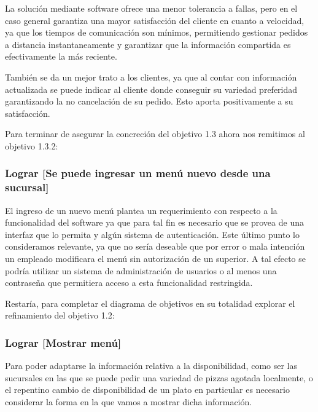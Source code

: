 \documentclass[a4paper,10pt]{article}
\begin{document}
La solución mediante software ofrece una menor tolerancia a fallas, pero en el caso general garantiza una mayor satisfacción del cliente en cuanto a velocidad, ya que los tiempos de comunicación son mínimos, permitiendo gestionar pedidos a distancia instantaneamente y garantizar que la información compartida es efectivamente la más reciente.

También se da un mejor trato a los clientes, ya que al contar con información actualizada se puede indicar al cliente donde conseguir su variedad preferidad garantizando la no cancelación de su pedido. Esto aporta positivamente a su satisfacción.



Para terminar de asegurar la concreción del objetivo 1.3 ahora nos remitimos al objetivo 1.3.2:
\subsubsection*{Lograr [Se puede ingresar un menú nuevo desde una sucursal]}
El ingreso de un nuevo menú plantea un requerimiento con respecto a la funcionalidad del software ya que para tal fin es necesario que se provea de una interfaz que lo permita y algún sistema de autenticación. Este último punto lo consideramos relevante, ya que no sería deseable que por error o mala intención un empleado modificara el menú sin autorización de un superior. A tal efecto se podría utilizar un sistema de administración de usuarios o al menos una contraseña que permitiera acceso a esta funcionalidad restringida.

\begin{figure}[H]
\centering
{}
\caption{}
\end{figure}

Restaría, para completar el diagrama de objetivos en su totalidad explorar el refinamiento del objetivo 1.2:
\subsubsection*{Lograr [Mostrar menú]}
Para poder adaptarse la información relativa a la disponibilidad, como ser las sucursales en las que se puede pedir una variedad de pizzas agotada localmente, o el repentino cambio de disponibilidad de un plato en particular es necesario considerar la forma en la que vamos a mostrar dicha información.
\end{document}
